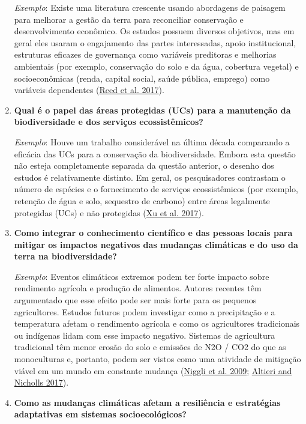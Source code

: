 \documentclass[
]{article}
\begin{document}
\begin{enumerate}
  \emph{Exemplo}: Existe uma literatura crescente usando abordagens de paisagem para melhorar a gestão da terra para reconciliar conservação e desenvolvimento econômico. Os estudos possuem diversos objetivos, mas em geral eles usaram o engajamento das partes interessadas, apoio institucional, estruturas eficazes de governança como variáveis preditoras e melhorias ambientais (por exemplo, conservação do solo e da água, cobertura vegetal) e socioeconômicas (renda, capital social, saúde pública, emprego) como variáveis dependentes (\protect\hyperlink{ref-reed_have_2017}{Reed et al. 2017}).
\item
  \textbf{Qual é o papel das áreas protegidas (UCs) para a manutenção da biodiversidade e dos serviços ecossistêmicos?}

  \emph{Exemplo}: Houve um trabalho considerável na última década comparando a eficácia das UCs para a conservação da biodiversidade. Embora esta questão não esteja completamente separada da questão anterior, o desenho dos estudos é relativamente distinto. Em geral, os pesquisadores contrastam o número de espécies e o fornecimento de serviços ecossistêmicos (por exemplo, retenção de água e solo, sequestro de carbono) entre áreas legalmente protegidas (UCs) e não protegidas (\protect\hyperlink{ref-xu_strengthening_2017}{Xu et al. 2017}).
\item
  \textbf{Como integrar o conhecimento científico e das pessoas locais para mitigar os impactos negativos das mudanças climáticas e do uso da terra na biodiversidade?}

  \emph{Exemplo}: Eventos climáticos extremos podem ter forte impacto sobre rendimento agrícola e produção de alimentos. Autores recentes têm argumentado que esse efeito pode ser mais forte para os pequenos agricultores. Estudos futuros podem investigar como a precipitação e a temperatura afetam o rendimento agrícola e como os agricultores tradicionais ou indígenas lidam com esse impacto negativo. Sistemas de agricultura tradicional têm menor erosão do solo e emissões de N2O / CO2 do que as monoculturas e, portanto, podem ser vistos como uma atividade de mitigação viável em um mundo em constante mudança (\protect\hyperlink{ref-niggli_low_2009}{Niggli et al. 2009}; \protect\hyperlink{ref-altieri_adaptation_2017}{Altieri and Nicholls 2017}).
\item
  \textbf{Como as mudanças climáticas afetam a resiliência e estratégias adaptativas em sistemas socioecológicos?}


\end{enumerate}
\end{document}
